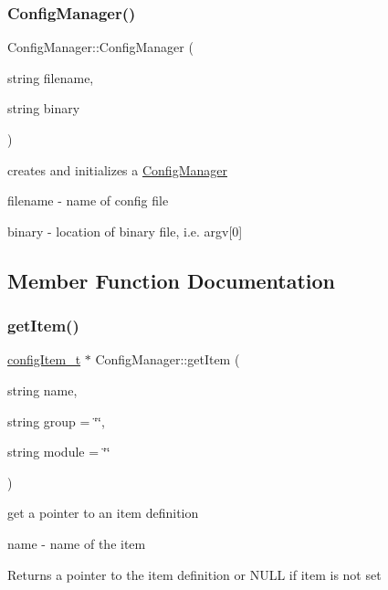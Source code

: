 \subsubsection{\texorpdfstring{Config\+Manager()}{ConfigManager()}}
{\footnotesize\ttfamily Config\+Manager\+::\+Config\+Manager (\begin{DoxyParamCaption}\item[{string}]{filename,  }\item[{string}]{binary }\end{DoxyParamCaption})}

creates and initializes a \hyperlink{classConfigManager}{Config\+Manager} \begin{DoxyItemize}
\item {\ttfamily filename} -\/ name of config file \item {\ttfamily binary} -\/ location of binary file, i.\+e. argv\mbox{[}0\mbox{]} \end{DoxyItemize}


\subsection{Member Function Documentation}
\mbox{\label{classConfigManager_a3cdebcc0fc8ce6148943963ba64ba342}} 
\subsubsection{\texorpdfstring{get\+Item()}{getItem()}}
{\footnotesize\ttfamily \hyperlink{structconfigItem}{config\+Item\+\_\+t} $\ast$ Config\+Manager\+::get\+Item (\begin{DoxyParamCaption}\item[{string}]{name,  }\item[{string}]{group = {\ttfamily \char`\"{}\char`\"{}},  }\item[{string}]{module = {\ttfamily \char`\"{}\char`\"{}} }\end{DoxyParamCaption})}



get a pointer to an item definition 

\begin{DoxyItemize}
\item {\ttfamily name} -\/ name of the item \begin{DoxyReturn}{Returns}
a pointer to the item definition or N\+U\+LL if item is not set 
\end{DoxyReturn}
\end{DoxyItemize}
\mbox{\label{classConfigManager_ae6ad7a04fbbc00fa5f5297daed17e4df}} 
